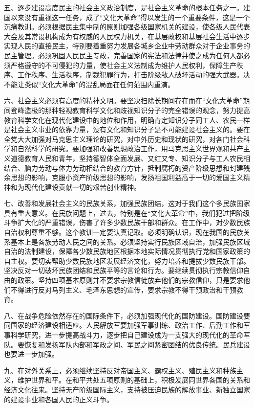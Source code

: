 五、逐步建设高度民主的社会主义政治制度，是社会主义革命的根本任务之一。建国以来没有重视这一任务，成了“文化大革命”得以发生的一个重要条件，这是一个沉痛教训。必须根据民主集中制的原则加强各级国家机关的建设，使各级人民代表大会及其常设机构成为有权威的人民权力机关，在基层政权和基层社会生活中逐步实现人民的直接民主，特别要着重努力发展各城乡企业中劳动群众对于企业事务的民主管理。必须巩固人民民主专政，完善国家的宪法和法律并使之成为任何人都必须严格遵守的不可侵犯的力量，使社会主义法制成为维护人民权利，保障生产秩序、工作秩序、生活秩序，制裁犯罪行为，打击阶级敌人破坏活动的强大武器。决不能让类似“文化大革命”的混乱局面在任何范围内重演。

六、社会主义必须有高度的精神文明。要坚决扫除长期间存在而在“文化大革命”期间登峰造极的那种轻视教育科学文化和歧视知识分子的完全错误的观念，努力提高教育科学文化在现代化建设中的地位和作用，明确肯定知识分子同工人、农民一样是社会主义事业的依靠力量，没有文化和知识分子是不可能建设社会主义的。要在全党大大加强对马克思主义理论的研究，对中外历史和现状的研究，对各门社会科学和自然科学的研究。要加强和改善思想政治工作，用马克思主义世界观和共产主义道德教育人民和青年，坚持德智体全面发展、又红又专、知识分子与工人农民相结合、脑力劳动与体力劳动相结合的教育方针，抵制腐朽的资产阶级思想和封建残余思想的影响，克服小资产阶级思想的影响，发扬祖国利益高于一切的爱国主义精神和为现代化建设贡献一切的艰苦创业精神。

七、改善和发展社会主义的民族关系，加强民族团结，这对于我们这个多民族国家具有重大意义。在民族问题上，过去，特别是在“文化大革命”中，我们犯过把阶级斗争扩大化的严重错误，伤害了许多少数民族干部和群众。在工作中，对少数民族自治权利尊重不够。这个教训一定要认真记取。必须明确认识，现在我国的民族关系基本上是各族劳动人民之间的关系。必须坚持实行民族区域自治，加强民族区域自治的法制建设，保障各少数民族地区根据本地实际情况贯彻执行党和国家政策的自主权。要切实帮助少数民族地区发展经济文化，努力培养和提拔少数民族干部。坚决反对一切破坏民族团结和民族平等的言论和行为。要继续贯彻执行宗教信仰自由的政策。坚持四项基本原则并不要求宗教信徒放弃他们的宗教信仰，只是要求他们不得进行反对马列主义、毛泽东思想的宣传，要求宗教不得干预政治和干预教育。

八、在战争危险依然存在的国际条件下，必须加强现代化的国防建设。国防建设要同国家的经济建设相适应。人民解放军要加强军事训练、政治工作、后勤工作和军事科学研究，进一步提高战斗力，逐步把自己建设成为一支强大的现代化的革命军队。要恢复和发扬军队内部和军政之间、军民之间紧密团结的优良传统。民兵建设也要进一步加强。

九、在对外关系上，必须继续坚持反对帝国主义、霸权主义、殖民主义和种族主义，维护世界和平。在和平共处五项原则的基础上，积极发展同世界各国的关系和经济文化往来。坚持无产阶级国际主义，支持被压迫民族的解放事业、新独立国家的建设事业和各国人民的正义斗争。

